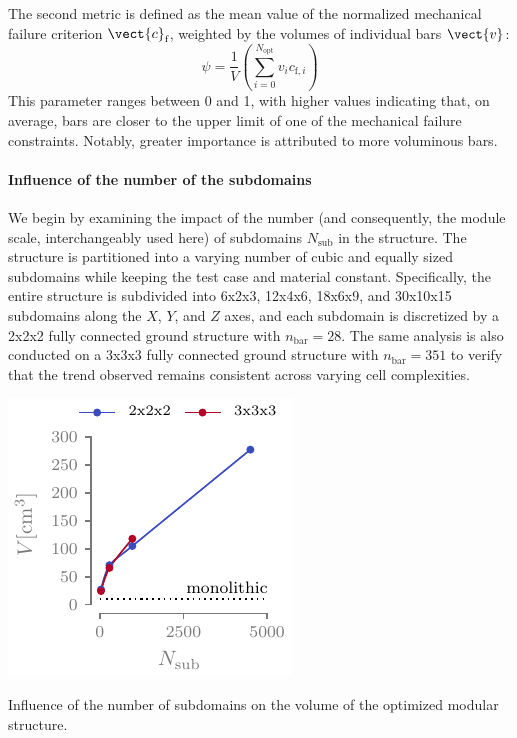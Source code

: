 The second metric is defined as the mean value of the normalized mechanical failure criterion $\vect{c}_\text{f}$, weighted by the volumes of individual bars $\vect{v}$:
\begin{equation}
    \psi = \frac{1}{V} \left( \sum_{i=0}^{N_\text{opt}} v_i c_{\text{f},i} \right)
\end{equation}
This parameter ranges between 0 and 1, with higher values indicating that, on average, bars are closer to the upper limit of one of the mechanical failure constraints. Notably, greater importance is attributed to more voluminous bars.

\paragraph{Influence of the number of the subdomains}
We begin by examining the impact of the number (and consequently, the module scale, interchangeably used here) of subdomains $N_\text{sub}$ in the structure. The structure is partitioned into a varying number of cubic and equally sized subdomains while keeping the test case and material constant. Specifically, the entire structure is subdivided into 6x2x3, 12x4x6, 18x6x9, and 30x10x15 subdomains along the $X$, $Y$, and $Z$ axes, and each subdomain is discretized by a 2x2x2 fully connected ground structure with $n_{\text{bar}} = 28$. The same analysis is also conducted on a 3x3x3 fully connected ground structure with $n_{\text{bar}} = 351$ to verify that the trend observed remains consistent across varying cell complexities.

\begin{marginfigure}
    \centering
    \includegraphics{figures/05_cellular_opt/00_module_scale_tab/scale_tab_v.pdf}
    \caption{Influence of the number of subdomains on the volume of the optimized modular structure.}
    \label{fig:05_scale_v}
\end{marginfigure}

